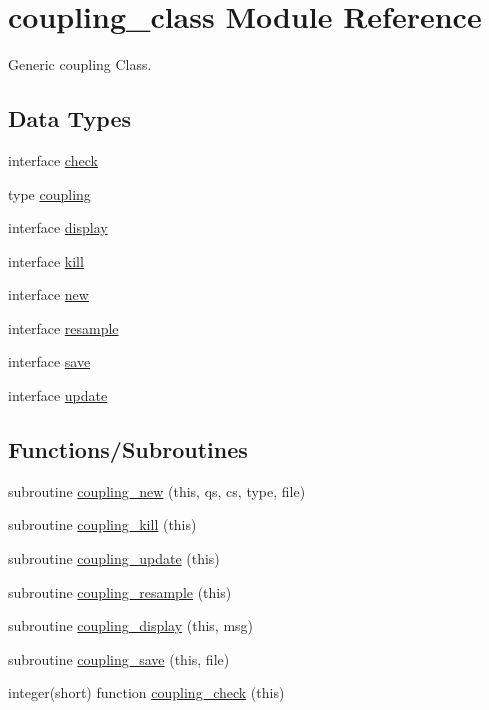 \hypertarget{namespacecoupling__class}{}\section{coupling\+\_\+class Module Reference}
\label{namespacecoupling__class}


Generic coupling Class.  


\subsection*{Data Types}
\begin{DoxyCompactItemize}
\item 
interface \hyperlink{interfacecoupling__class_1_1check}{check}
\item 
type \hyperlink{structcoupling__class_1_1coupling}{coupling}
\item 
interface \hyperlink{interfacecoupling__class_1_1display}{display}
\item 
interface \hyperlink{interfacecoupling__class_1_1kill}{kill}
\item 
interface \hyperlink{interfacecoupling__class_1_1new}{new}
\item 
interface \hyperlink{interfacecoupling__class_1_1resample}{resample}
\item 
interface \hyperlink{interfacecoupling__class_1_1save}{save}
\item 
interface \hyperlink{interfacecoupling__class_1_1update}{update}
\end{DoxyCompactItemize}
\subsection*{Functions/\+Subroutines}
\begin{DoxyCompactItemize}
\item 
subroutine \hyperlink{namespacecoupling__class_a5fa07e475bf96111bc76820037fc26a4}{coupling\+\_\+new} (this, qs, cs, type, file)
\item 
subroutine \hyperlink{namespacecoupling__class_a774339d5b87453601c0664a199df7823}{coupling\+\_\+kill} (this)
\item 
subroutine \hyperlink{namespacecoupling__class_a034f9e137631afdb03a75cc32bf1956d}{coupling\+\_\+update} (this)
\item 
subroutine \hyperlink{namespacecoupling__class_ad26da11333ea64f68c25250a35287a51}{coupling\+\_\+resample} (this)
\item 
subroutine \hyperlink{namespacecoupling__class_a543d9a76307b2c60048d8f390fb40859}{coupling\+\_\+display} (this, msg)
\item 
subroutine \hyperlink{namespacecoupling__class_af46ffcc2d49425d21e248f173b5377bd}{coupling\+\_\+save} (this, file)
\item 
integer(short) function \hyperlink{namespacecoupling__class_a41b687a0ad543c445aa29923c229e39d}{coupling\+\_\+check} (this)
\end{DoxyCompactItemize}


